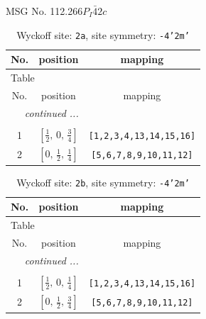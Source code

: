 \documentclass[fleqn,8pt]{jsarticle}
\begin{document}
\setcounter{MaxMatrixCols}{32}

\renewcommand{\tablename}{Table~}
\renewcommand{\figurename}{Figure~}
\begin{center}
\LARGE
MSG No. 112.266\quad$P_{I}\bar{4}2c$
\end{center}
\renewcommand{\arraystretch}{1.2}
\begin{longtable}{ccc}
\caption{Wyckoff site: {\tt 2a}, site symmetry: {\tt -4'2m'}}
 \\
 \hline \hline
No. & position & mapping \\ \hline \endfirsthead

\multicolumn{2}{l}{\tablename\ \thetable{}} \\
 \hline \hline
No. & position & mapping \\ \hline \endhead

 \hline \hline
\multicolumn{2}{r}{\footnotesize\it continued ...} \\ \endfoot

 \hline \hline
\multicolumn{2}{r}{} \\ \endlastfoot

1 & $\left[ \frac{1}{2},\, 0,\, \frac{3}{4} \right]$ & {\tt [1,2,3,4,13,14,15,16]} \\ \hline
2 & $\left[ 0,\, \frac{1}{2},\, \frac{1}{4} \right]$ & {\tt [5,6,7,8,9,10,11,12]} \\
\end{longtable}
\renewcommand{\arraystretch}{1.2}
\begin{longtable}{ccc}
\caption{Wyckoff site: {\tt 2b}, site symmetry: {\tt -4'2m'}}
 \\
 \hline \hline
No. & position & mapping \\ \hline \endfirsthead

\multicolumn{2}{l}{\tablename\ \thetable{}} \\
 \hline \hline
No. & position & mapping \\ \hline \endhead

 \hline \hline
\multicolumn{2}{r}{\footnotesize\it continued ...} \\ \endfoot

 \hline \hline
\multicolumn{2}{r}{} \\ \endlastfoot

1 & $\left[ \frac{1}{2},\, 0,\, \frac{1}{4} \right]$ & {\tt [1,2,3,4,13,14,15,16]} \\ \hline
2 & $\left[ 0,\, \frac{1}{2},\, \frac{3}{4} \right]$ & {\tt [5,6,7,8,9,10,11,12]} \\
\end{longtable}
\end{document}
